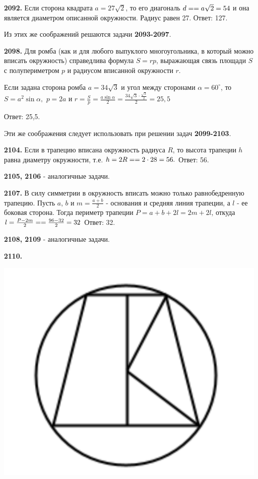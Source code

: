 \textbf{2092.} Если сторона квадрата $a = 27\sqrt{2}$, то его диагональ $d=\linebreak=a\sqrt{2}=54$ и она является диаметром описанной окружности. Радиус равен 27. \newline \null \hspace*{\fill} Ответ: 127.

Из этих же  соображений решаются задачи \textbf{2093-2097}.

\textbf{2098.} Для ромба (как и для любого выпуклого многоугольника, в который можно вписать окружность) справедлива формула $S = rp$, выражающая связь площади $S$ с полупериметром $p$ и радиусом вписанной окружности $r$.

Если задана сторона ромба $a=34\sqrt{3}$ и угол между сторонами $\alpha = 60^\circ$, то $S = a^2 \sin{\alpha},$ $p = 2a$ и $r = \frac{S}{p} = \frac{a\sin{\alpha}}{2}=\frac{34\sqrt{3}\cdot\frac{\sqrt{3}}{2}}{2} = 25,5$

\null \hspace*{\fill} Ответ: 25,5.

 Эти же соображения следует использовать при решении задач \textbf{2099-2103}.
 
 \textbf{2104.} Если в трапецию вписана окружность радиуса $R$, то высота трапеции $h$ равна диаметру окружности, т.е. $h = 2R = \linebreak = 2\cdot28 = 56.$ \newline \null \hspace*{\fill} Ответ: 56.
 
\textbf{2105, 2106} - аналогичные задачи.

\textbf{2107.}  В силу симметрии в окружность вписать можно только равнобедренную трапецию. Пусть $a$, $b$ и $m = \frac{a+b}{2}$ - основания и средняя линия трапеции, а $l$ - ее боковая сторона. Тогда периметр трапеции $P = a + b+2l = 2m+2l$, откуда $l = \frac{P-2m}{2}=\linebreak =\frac{96-32}{2}=32$ \newline \null \hspace*{\fill} Ответ: 32.

\textbf{2108, 2109} - аналогичные задачи.

\clearpage
\textbf{2110.}

{\centering \includegraphics[width=0.35\linewidth]{Geometry/Content/40.png}
	
}

